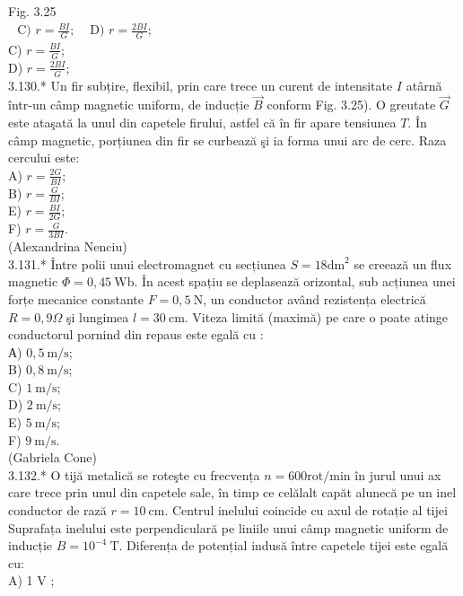 \documentclass[10pt]{article}
\begin{document}
Fig. 3.25\\
$\begin{array}{ll}\text { C) } r=\frac{B I}{G} ; & \text { D) } r=\frac{2 B I}{G} ;\end{array}$\\
C) $r=\frac{B I}{G}$;\\
D) $r=\frac{2 B I}{G}$;\\
3.130.* Un fir subțire, flexibil, prin care trece un curent de intensitate $I$ atârnă într-un câmp magnetic uniform, de inducție $\vec{B}$ conform Fig. 3.25). O greutate $\vec{G}$ este ataşată la unul din capetele firului, astfel că în fir apare tensiunea $T$. În câmp magnetic, porțiunea din fir se curbează şi ia forma unui arc de cerc. Raza cercului este:\\
A) $r=\frac{2 G}{B I}$;\\
B) $r=\frac{G}{B I}$;\\
E) $r=\frac{B I}{2 G}$;\\
F) $r=\frac{G}{3 B I}$.\\
(Alexandrina Nenciu)\\
3.131.* Între polii unui electromagnet cu secțiunea $S=18 \mathrm{dm}^{2}$ se creează un flux magnetic $\Phi=0,45 \mathrm{~Wb}$. În acest spațiu se deplasează orizontal, sub acțiunea unei forțe mecanice constante $F=0,5 \mathrm{~N}$, un conductor având rezistența electrică $R=0,9 \Omega$ şi lungimea $l=30 \mathrm{~cm}$. Viteza limită (maximă) pe care o poate atinge conductorul pornind din repaus este egală cu :\\
А) $0,5 \mathrm{~m} / \mathrm{s}$;\\
B) $0,8 \mathrm{~m} / \mathrm{s}$;\\
C) $1 \mathrm{~m} / \mathrm{s}$;\\
D) $2 \mathrm{~m} / \mathrm{s}$;\\
E) $5 \mathrm{~m} / \mathrm{s}$;\\
F) $9 \mathrm{~m} / \mathrm{s}$.\\
(Gabriela Cone)\\
3.132.* O tijă metalică se roteşte cu frecvența $n=600 \mathrm{rot} / \mathrm{min}$ în jurul unui ax care trece prin unul din capetele sale, în timp ce celălalt capăt alunecă pe un inel conductor de rază $r=10 \mathrm{~cm}$. Centrul inelului coincide cu axul de rotație al tijei Suprafața inelului este perpendiculară pe liniile unui câmp magnetic uniform de inducție $B=10^{-4} \mathrm{~T}$. Diferența de potențial indusă între capetele tijei este egală cu:\\
A) 1 V ;\\
\end{document}
